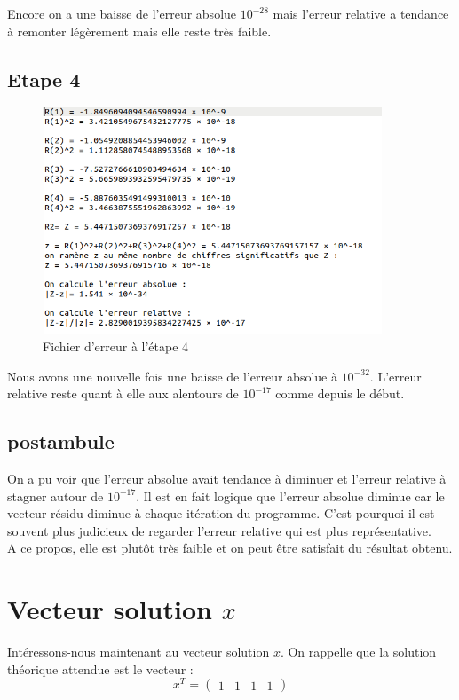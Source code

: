 \documentclass[12,french]{report}
\begin{document}
Encore on a une baisse de l'erreur absolue $10^{-28}$ mais l'erreur relative a tendance à remonter légèrement mais elle reste très faible.

\section{Etape 4}

\begin{figure}[H]
	\center
	\includegraphics[width=0.9\textwidth]{./Images/r_4_err}
	\caption{Fichier d'erreur à l'étape 4}
\end{figure}

Nous avons une nouvelle fois une baisse de l'erreur absolue à $10^{-32}$. L'erreur relative reste quant à elle aux alentours de $10^{-17}$ comme depuis le début.

\section{postambule}

On a pu voir que l'erreur absolue avait tendance à diminuer et l'erreur relative à stagner autour de $10^{-17}$. Il est en fait logique que l'erreur absolue diminue car le vecteur résidu diminue à chaque itération du programme. C'est pourquoi il est souvent plus judicieux de regarder l'erreur relative qui est plus représentative.\\
A ce propos, elle est plutôt très faible et on peut être satisfait du résultat obtenu.

\chapter{Vecteur solution $x$} %

Intéressons-nous maintenant au vecteur solution $x$. On rappelle que la solution théorique attendue est le vecteur :
$$x^T=\left(\begin{array}{cccc}
1 & 1 & 1 & 1\end{array}\right)$$
\end{document}

